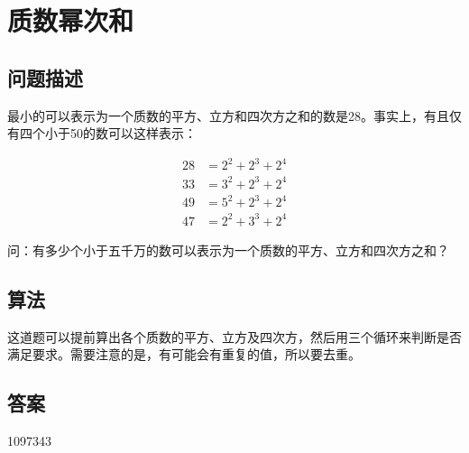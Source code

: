 \section{质数幂次和}
\subsection{问题描述}
\begin{tcolorbox}
	最小的可以表示为一个质数的平方、立方和四次方之和的数是28。事实上，有且仅有四个小于50的数可以这样表示：

	\begin{align*}
		28 & = 2^2 + 2^3 + 2^4 \\
		33 & = 3^2 + 2^3 + 2^4 \\
		49 & = 5^2 + 2^3 + 2^4 \\
		47 & = 2^2 + 3^3 + 2^4
	\end{align*}

	问：有多少个小于五千万的数可以表示为一个质数的平方、立方和四次方之和？
\end{tcolorbox}

\subsection{算法}
这道题可以提前算出各个质数的平方、立方及四次方，然后用三个循环来判断是否满足要求。需要注意的是，有可能会有重复的值，所以要去重。

\subsection{答案}
1097343
